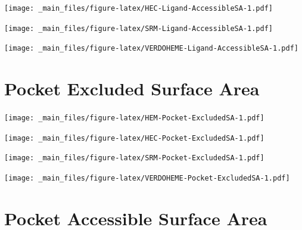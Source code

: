 \documentclass[a4paper, nobind]{templates/ociamthesis}
\let\origfigure\figure
\let\endorigfigure\endfigure
\renewenvironment{figure}[1][2] {
    \expandafter\origfigure\expandafter[H]
} {
    \endorigfigure
}
\begin{document}
\begin{figure}
\centering
\texttt{[image: \_main\_files/figure-latex/HEC-Ligand-AccessibleSA-1.pdf]}
\caption{\label{fig:HEC-Ligand-AccessibleSA}HEC: Ligand Accessible Surface Area}
\end{figure}

\begin{figure}
\centering
\texttt{[image: \_main\_files/figure-latex/SRM-Ligand-AccessibleSA-1.pdf]}
\caption{\label{fig:SRM-Ligand-AccessibleSA}SRM: Ligand Accessible Surface Area}
\end{figure}

\begin{figure}
\centering
\texttt{[image: \_main\_files/figure-latex/VERDOHEME-Ligand-AccessibleSA-1.pdf]}
\caption{\label{fig:VERDOHEME-Ligand-AccessibleSA}VERDOHEME: Ligand Accessible Surface Area}
\end{figure}

\hypertarget{figs-pocketExcSA}{%
\section{Pocket Excluded Surface Area}\label{figs-pocketExcSA}}

\begin{figure}
\centering
\texttt{[image: \_main\_files/figure-latex/HEM-Pocket-ExcludedSA-1.pdf]}
\caption{\label{fig:HEM-Pocket-ExcludedSA}HEM: Pocket Excluded Surface Area}
\end{figure}

\begin{figure}
\centering
\texttt{[image: \_main\_files/figure-latex/HEC-Pocket-ExcludedSA-1.pdf]}
\caption{\label{fig:HEC-Pocket-ExcludedSA}HEC: Pocket Excluded Surface Area}
\end{figure}

\begin{figure}
\centering
\texttt{[image: \_main\_files/figure-latex/SRM-Pocket-ExcludedSA-1.pdf]}
\caption{\label{fig:SRM-Pocket-ExcludedSA}SRM: Pocket Excluded Surface Area}
\end{figure}

\begin{figure}
\centering
\texttt{[image: \_main\_files/figure-latex/VERDOHEME-Pocket-ExcludedSA-1.pdf]}
\caption{\label{fig:VERDOHEME-Pocket-ExcludedSA}VERDOHEME: Pocket Excluded Surface Area}
\end{figure}

\hypertarget{figs-pocketAccSA}{%
\section{Pocket Accessible Surface Area}\label{figs-pocketAccSA}}
\end{document}
